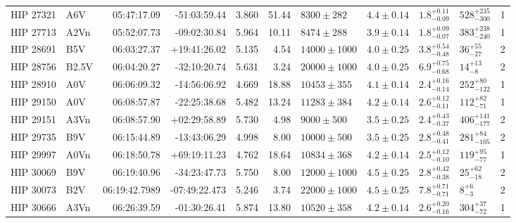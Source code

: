 \begin{landscape}
\begin{scriptsize}
\begin{longtable}{|l|lrrrrlllll|}
   HIP 27321 &      A6V &    05:47:17.09 &   -51:03:59.44 &   3.860 &     51.44 &    $8300 \pm 282$ &  $4.4 \pm 0.14$ &  $1.8^{+0.11}_{-0.09}$ &   $528^{+235}_{-300}$ &       1 \\
   HIP 27713 &     A2Vn &    05:52:07.73 &   -09:02:30.84 &   5.964 &     10.11 &    $8474 \pm 288$ &  $3.9 \pm 0.14$ &  $1.8^{+0.09}_{-0.07}$ &   $383^{+238}_{-240}$ &       1 \\
   HIP 28691 &      B5V &    06:03:27.37 &   +19:41:26.02 &   5.135 &      4.54 &  $14000 \pm 1000$ &  $4.0 \pm 0.25$ &  $3.8^{+0.54}_{-0.48}$ &      $36^{+55}_{-27}$ &       2 \\
   HIP 28756 &    B2.5V &    06:04:20.27 &   -32:10:20.74 &   5.631 &      3.24 &  $20000 \pm 1000$ &  $4.0 \pm 0.25$ &  $6.9^{+0.75}_{-0.68}$ &       $14^{+13}_{-8}$ &       2 \\
   HIP 28910 &      A0V &    06:06:09.32 &   -14:56:06.92 &   4.669 &     18.88 &   $10453 \pm 355$ &  $4.1 \pm 0.14$ &  $2.4^{+0.16}_{-0.14}$ &    $252^{+80}_{-122}$ &       1 \\
   HIP 29150 &      A0V &    06:08:57.87 &   -22:25:38.68 &   5.482 &     13.24 &   $11283 \pm 384$ &  $4.2 \pm 0.14$ &  $2.6^{+0.12}_{-0.11}$ &     $112^{+82}_{-71}$ &       1 \\
   HIP 29151 &     A3Vn &    06:08:57.90 &   +02:29:58.89 &   5.730 &      4.98 &    $9000 \pm 500$ &  $3.5 \pm 0.25$ &  $2.4^{+0.43}_{-0.37}$ &   $406^{+141}_{-177}$ &       2 \\
   HIP 29735 &      B9V &    06:15:44.89 &   -13:43:06.29 &   4.998 &      8.00 &   $10000 \pm 500$ &  $3.5 \pm 0.25$ &  $2.8^{+0.48}_{-0.41}$ &    $281^{+84}_{-105}$ &       2 \\
   HIP 29997 &     A0Vn &    06:18:50.78 &   +69:19:11.23 &   4.762 &     18.64 &   $10834 \pm 368$ &  $4.2 \pm 0.14$ &  $2.5^{+0.12}_{-0.10}$ &     $119^{+95}_{-77}$ &       1 \\
   HIP 30069 &      B9V &    06:19:40.96 &   -34:23:47.73 &   5.750 &      8.00 &  $12000 \pm 1000$ &  $4.5 \pm 0.25$ &  $2.8^{+0.42}_{-0.38}$ &      $25^{+62}_{-18}$ &       2 \\
   HIP 30073 &     B2V  &  06:19:42.7989 &  -07:49:22.473 &   5.246 &      3.74 &  $22000 \pm 1000$ &  $4.5 \pm 0.25$ &  $7.8^{+0.71}_{-0.71}$ &         $8^{+6}_{-3}$ &       2 \\
   HIP 30666 &     A3Vn &    06:26:39.59 &   -01:30:26.41 &   5.874 &     13.80 &   $10520 \pm 358$ &  $4.2 \pm 0.14$ &  $2.6^{+0.20}_{-0.16}$ &     $304^{+37}_{-72}$ &       1 \\

\end{longtable}
\end{scriptsize}
\end{landscape}
